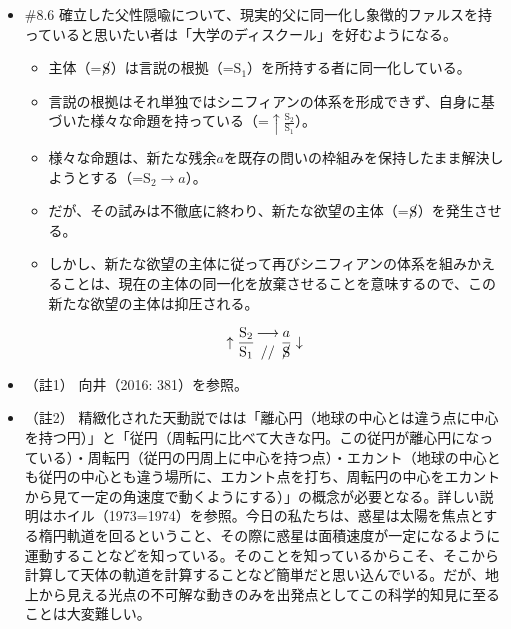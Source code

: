 \begin{note}{}
  \begin{itemize}
    \tightlist
    \item{\#8.6}
      確立した父性隠喩について、現実的父に同一化し象徴的ファルスを持っていると思いたい者は「\mbox{大学のディスクール}」を好むようになる。
      \begin{itemize}
          \tightlist
          \item
          主体（=$\cancel{\textrm{S}}$）は言説の根拠（=$\textrm{S}_1$）を所持する者に同一化している。
          \item
          言説の根拠はそれ単独ではシニフィアンの体系を形成できず、自身に基づいた様々な命題を持っている（=$\uparrow\frac{\textrm{S}_2}{\textrm{S}_1}$）。
          \item
          様々な命題は、新たな残余$a$を既存の問いの枠組みを保持したまま解決しようとする（=$\textrm{S}_2\rightarrow a$）。
          \item
          だが、その試みは不徹底に終わり、新たな欲望の主体（=$\cancel{\textrm{S}}$）を発生させる。
          \item
          しかし、新たな欲望の主体に従って再びシニフィアンの体系を組みかえることは、現在の主体の同一化を放棄させることを意味するので、この新たな欲望の主体は抑圧される。
        \end{itemize}

$$
\uparrow\frac{\mathrm{S_2}}{\mathrm{S_1}}\genfrac{}{}{0pt}{}{\longrightarrow}{//}\frac{a}{\cancel{\textrm{S}}}\downarrow
$$
  \end{itemize}
\end{note}

\begin{itemize}
\tightlist
\item
  （註1） 向井（2016: 381）\cite{Mukai}を参照。
\item
  （註2）
  精緻化された天動説ではは「離心円（地球の中心とは違う点に中心を持つ円）」と「従円（周転円に比べて大きな円。この従円が離心円になっている）・周転円（従円の円周上に中心を持つ点）・エカント（地球の中心とも従円の中心とも違う場所に、エカント点を打ち、周転円の中心をエカントから見て一定の角速度で動くようにする）」の概念が必要となる。詳しい説明はホイル（1973=1974）\cite{Hoyle}を参照。今日の私たちは、惑星は太陽を焦点とする楕円軌道を回るということ、その際に惑星は面積速度が一定になるように運動することなどを知っている。そのことを知っているからこそ、そこから計算して天体の軌道を計算することなど簡単だと思い込んでいる。だが、地上から見える光点の不可解な動きのみを出発点としてこの科学的知見に至ることは大変難しい。
\end{itemize}

